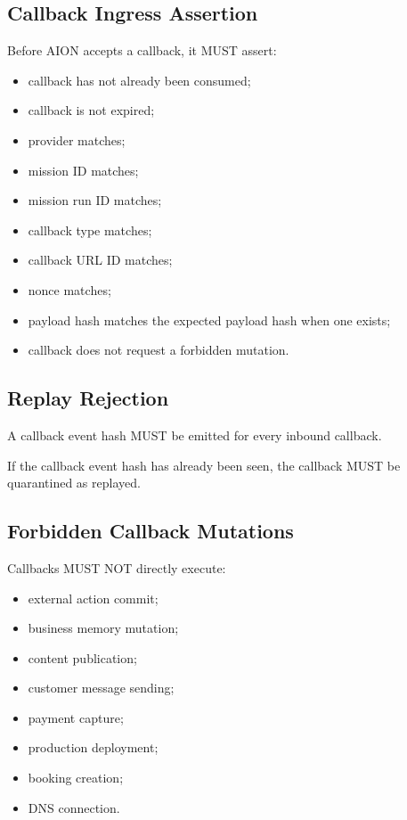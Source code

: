 \subsection{Callback Ingress Assertion}

Before AION accepts a callback, it MUST assert:

\begin{itemize}
  \item callback has not already been consumed;
  \item callback is not expired;
  \item provider matches;
  \item mission ID matches;
  \item mission run ID matches;
  \item callback type matches;
  \item callback URL ID matches;
  \item nonce matches;
  \item payload hash matches the expected payload hash when one exists;
  \item callback does not request a forbidden mutation.
\end{itemize}

\subsection{Replay Rejection}

A callback event hash MUST be emitted for every inbound callback.

If the callback event hash has already been seen, the callback MUST be quarantined as replayed.

\subsection{Forbidden Callback Mutations}

Callbacks MUST NOT directly execute:

\begin{itemize}
  \item external action commit;
  \item business memory mutation;
  \item content publication;
  \item customer message sending;
  \item payment capture;
  \item production deployment;
  \item booking creation;
  \item DNS connection.
\end{itemize}

